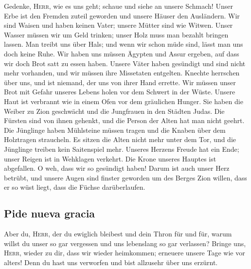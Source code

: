  Gedenke, \textsc{Herr}, wie es uns geht; schaue und siehe
an unsere Schmach!  Unser Erbe ist den Fremden zuteil
geworden und unsere Häuser den Ausländern.  Wir sind
Waisen und haben keinen Vater; unsere Mütter sind wie Witwen.
 Unser Wasser müssen wir um Geld trinken; unser Holz muss
man bezahlt bringen lassen.  Man treibt uns über Hals; und
wenn wir schon müde sind, lässt man uns doch keine Ruhe. 
Wir haben uns müssen Ägypten und Assur ergeben, auf dass wir doch Brot
satt zu essen haben.  Unsere Väter haben gesündigt und
sind nicht mehr vorhanden, und wir müssen ihre Missetaten entgelten.
 Knechte herrschen über uns, und ist niemand, der uns von
ihrer Hand errette.  Wir müssen unser Brot mit Gefahr
unseres Lebens holen vor dem Schwert in der Wüste. 
Unsere Haut ist verbrannt wie in einem Ofen vor dem gräulichen Hunger.
 Sie haben die Weiber zu Zion geschwächt und die
Jungfrauen in den Städten Judas.  Die Fürsten sind von
ihnen gehenkt, und die Person der Alten hat man nicht geehrt.
 Die Jünglinge haben Mühlsteine müssen tragen und die
Knaben über dem Holztragen straucheln.  Es sitzen die
Alten nicht mehr unter dem Tor, und die Jünglinge treiben kein
Saitenspiel mehr.  Unseres Herzens Freude hat ein Ende;
unser Reigen ist in Wehklagen verkehrt.  Die Krone
unseres Hauptes ist abgefallen. O weh, dass wir so gesündigt haben!
 Darum ist auch unser Herz betrübt, und unsere Augen sind
finster geworden  um des Berges Zion willen, dass er so
wüst liegt, dass die Füchse darüberlaufen.

\hypertarget{pide-nueva-gracia}{%
\subsection{Pide nueva gracia}\label{pide-nueva-gracia}}

 Aber du, \textsc{Herr}, der du ewiglich bleibest und
dein Thron für und für,  warum willst du unser so gar
vergessen und uns lebenslang so gar verlassen?  Bringe
uns, \textsc{Herr}, wieder zu dir, dass wir wieder heimkommen; erneuere
unsere Tage wie vor alters!  Denn du hast uns verworfen
und bist allzusehr über uns erzürnt.
